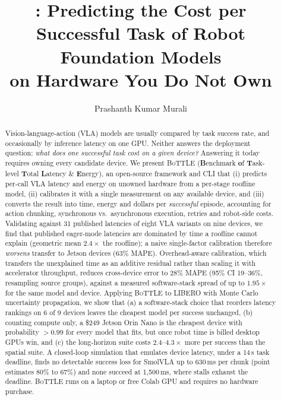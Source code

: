 \documentclass[10pt]{article}
\title{\bottle: Predicting the Cost per Successful Task of Robot Foundation Models\\on Hardware You Do Not Own}
\author{Prashanth Kumar Murali}
\date{}
\newcommand{\bottle}{\textsc{BoTTLE}}
\begin{document}
\maketitle

\begin{abstract}
Vision-language-action (VLA) models are usually compared by task success rate, and occasionally by
inference latency on one GPU. Neither answers the deployment question: \emph{what does one
successful task cost on a given device?} Answering it today requires owning every candidate
device. We present \bottle{} (\textbf{B}enchmark \textbf{o}f \textbf{T}ask-level \textbf{T}otal
\textbf{L}atency \& \textbf{E}nergy), an open-source framework and CLI that (i) predicts per-call
VLA latency and energy on unowned hardware from a per-stage roofline model, (ii) calibrates it with
a single measurement on any available device, and (iii) converts the result into time, energy and
dollars per \emph{successful} episode, accounting for action chunking, synchronous vs.\ asynchronous
execution, retries and robot-side costs. Validating against 31 published latencies of eight VLA
variants on nine devices, we find that published eager-mode latencies are dominated by time a
roofline cannot explain (geometric mean $2.4\times$ the roofline); a naive single-factor
calibration therefore \emph{worsens} transfer to Jetson devices (63\% MAPE). Overhead-aware
calibration, which transfers the unexplained time as an additive residual rather than scaling it
with accelerator throughput, reduces cross-device error to 28\% MAPE (95\% CI 19--36\%, resampling
source groups), against a measured software-stack spread of up to $1.95\times$ for the same model
and device. Applying \bottle{} to LIBERO with Monte Carlo uncertainty propagation, we show that
(a) a software-stack choice that reorders latency rankings on 6 of 9 devices leaves the cheapest
model per success unchanged, (b) counting compute only, a \$249 Jetson Orin Nano is the cheapest
device with probability $>0.99$ for every model that fits, but once robot time is billed desktop
GPUs win, and (c) the long-horizon suite costs $2.4$--$4.3\times$ more per success than the
spatial suite. A closed-loop simulation that emulates device latency, under a 14\,s task
deadline, finds no detectable success loss for SmolVLA up to 630\,ms per chunk (point estimates
80\% to 67\%) and none succeed at 1{,}500\,ms, where stalls exhaust the deadline. \bottle{} runs on a laptop or free Colab GPU and requires no hardware purchase.
\end{abstract}
\end{document}
